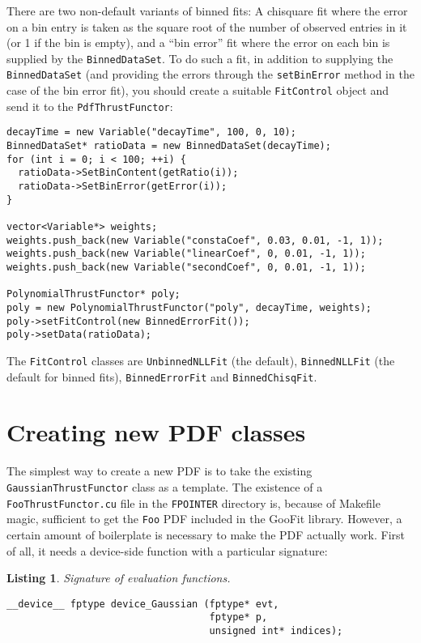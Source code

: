 \documentclass[12pt,pdflatex]{article}
\newtheorem{listing}{Listing}
\begin{document}
There are two non-default variants of binned fits: A chisquare
fit where the error on a bin entry is taken as the square root
of the number of observed entries in it (or 1 if the bin is empty),
and a ``bin error'' fit where the error on each bin is supplied
by the \texttt{BinnedDataSet}. To do such a fit, in addition to
supplying the \texttt{BinnedDataSet} (and providing the errors
through the \texttt{setBinError} method in the case of the bin error fit),
you should create a suitable \texttt{FitControl} object and send
it to the \texttt{PdfThrustFunctor}:
\begin{verbatim}
decayTime = new Variable("decayTime", 100, 0, 10); 
BinnedDataSet* ratioData = new BinnedDataSet(decayTime); 
for (int i = 0; i < 100; ++i) {
  ratioData->SetBinContent(getRatio(i));
  ratioData->SetBinError(getError(i));
}

vector<Variable*> weights;
weights.push_back(new Variable("constaCoef", 0.03, 0.01, -1, 1));
weights.push_back(new Variable("linearCoef", 0, 0.01, -1, 1));
weights.push_back(new Variable("secondCoef", 0, 0.01, -1, 1));

PolynomialThrustFunctor* poly;
poly = new PolynomialThrustFunctor("poly", decayTime, weights); 
poly->setFitControl(new BinnedErrorFit()); 
poly->setData(ratioData); 
\end{verbatim}
The \texttt{FitControl} classes are \texttt{UnbinnedNLLFit} (the default), 
\texttt{BinnedNLLFit} (the default for binned fits), \texttt{BinnedErrorFit}
and \texttt{BinnedChisqFit}. 

\section{Creating new PDF classes}
\label{sec:newpdfs}

The simplest way to create a new PDF is to take the existing 
\texttt{GaussianThrustFunctor} class as a template. The existence of
a \texttt{FooThrustFunctor.cu} file in the \texttt{FPOINTER} directory
is, because of Makefile magic, sufficient to get the \texttt{Foo} PDF
included in the GooFit library. However, a certain amount of boilerplate
is necessary to make the PDF actually work. First of all, it needs a 
device-side function with a particular signature:
\begin{listing}
\label{listing:fsign}
Signature of evaluation functions.

\begin{verbatim}
__device__ fptype device_Gaussian (fptype* evt, 
                                   fptype* p, 
                                   unsigned int* indices); 
\end{verbatim}
\end{listing}
\end{document}
